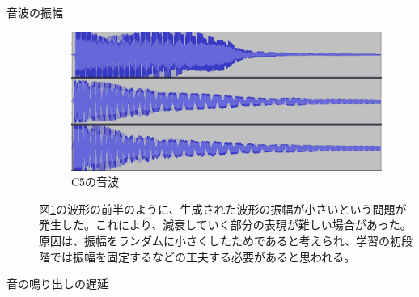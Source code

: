 \begin{description}

\item[音波の振幅]\mbox{}

\begin{figure}[t]
\begin{center}
\includegraphics[width=0.7\hsize]{figure/88_88/c5.png}
\caption{C5の音波}
\label{fig:88_88_amp}
\end{center}
\end{figure}

図\ref{fig:88_88_amp}の波形の前半のように、生成された波形の振幅が小さいという問題が発生した。これにより、減衰していく部分の表現が難しい場合があった。原因は、振幅をランダムに小さくしたためであると考えられ、学習の初段階では振幅を固定するなどの工夫する必要があると思われる。
    
\item[音の鳴り出しの遅延]\mbox{}


\end{description}
